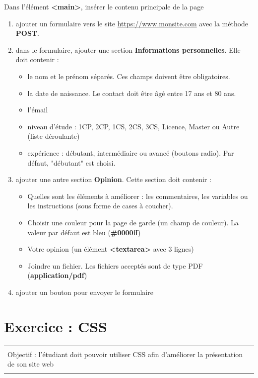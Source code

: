 \documentclass[11pt, a4paper]{article}
\begin{document}
Dans l'élément \textbf{<main>}, insérer le contenu principale de la page  
\begin{enumerate}
	\item ajouter un formulaire vers le site \url{https://www.monsite.com} avec la méthode \textbf{POST}. 
	\item dans le formulaire, ajouter une section \textbf{Informations personnelles}. 
	Elle doit contenir : 
	\begin{itemize}
		\item le nom et le prénom séparés. Ces champs doivent être obligatoires. 
		\item la date de naissance. Le contact doit être âgé entre 17 ans et 80 ans.
		\item l'émail 
		\item niveau d'étude : 1CP, 2CP, 1CS, 2CS, 3CS, Licence, Master ou Autre (liste déroulante)
		\item expérience : débutant, intermédiaire ou avancé (boutons radio). Par défaut, "débutant" est choisi.
	\end{itemize}
	\item ajouter une autre section \textbf{Opinion}. Cette section doit contenir : 
	\begin{itemize}
		\item Quelles sont les éléments à améliorer : les commentaires, les variables ou les instructions (sous forme de cases à coucher).
		\item Choisir une couleur pour la page de garde (un champ de couleur). La valeur par défaut est bleu (\textbf{\#0000ff})
		\item Votre opinion (un élément \textbf{<textarea>} avec 3 lignes)
		\item Joindre un fichier. Les fichiers acceptés sont de type PDF (\textbf{application/pdf})
	\end{itemize}
	\item ajouter un bouton pour envoyer le formulaire
\end{enumerate}




\section*{Exercice : CSS}

\vspace{-12pt}
\begin{tabular}{|p{\textwidth}|}
	\hline\\
	Objectif : l'étudiant doit pouvoir utiliser CSS afin d'améliorer la présentation de son site web \\\\
	\hline
\end{tabular}
\end{document}
